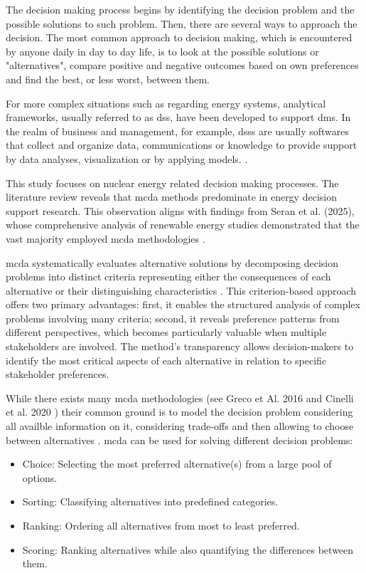 The decision making process begins by identifying the decision problem and the possible solutions to such problem. Then, there are several ways to approach the decision. The most common approach to decision making, which is encountered by anyone daily in day to day life, is to look at the possible solutions or "alternatives", compare positive and negative outcomes based on own preferences and find the best, or less worst, between them.

For more complex situations such as regarding energy systems, analytical frameworks, usually referred to as \gls{dss}, have been developed to support \glspl{dm}. In the realm of business and management, for example, \glspl{dss} are usually softwares that collect and organize data, communications or knowledge to provide support by data analyses, visualization or by applying models. \cite{Power2023}.

This study focuses on nuclear energy related decision making processes. The literature review reveals that \gls{mcda} methods predominate in energy decision support research. This observation aligns with findings from Seran et al. (2025), whose comprehensive analysis of renewable energy studies demonstrated that the vast majority employed \gls{mcda} methodologies \cite{SERAN2025100044}.

\gls{mcda} systematically evaluates alternative solutions by decomposing decision problems into distinct criteria representing either the consequences of each alternative or their distinguishing characteristics \cite{ROY1990324}. This criterion-based approach offers two primary advantages: first, it enables the structured analysis of complex problems involving many criteria; second, it reveals preference patterns from different perspectives, which becomes particularly valuable when multiple stakeholders are involved. The method's transparency allows decision-makers to identify the most critical aspects of each alternative in relation to specific stakeholder preferences.

While there exists many \gls{mcda} methodologies (see Greco et Al. 2016 \cite{Köksalan2016} and Cinelli et al. 2020 \cite{CINELLI2020102261}) their common ground is to model the decision problem considering all availble information on it, considering trade-offs and then allowing to choose between alternatives \cite{HAAG2022105361}. \gls{mcda} can be used for solving different decision problems:
\begin{itemize}
\item Choice: Selecting the most preferred alternative(s) from a large pool of options.
\item Sorting: Classifying alternatives into predefined categories.
\item Ranking: Ordering all alternatives from most to least preferred.
\item Scoring: Ranking alternatives while also quantifying the differences between them.
\end{itemize}

